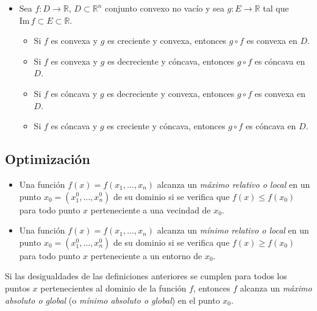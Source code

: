 \begin{Propty} 
\begin{itemize}
\item[v) ] Sea $f : D \to \mathbb{R}$, $D \subset \mathbb{R}^n$ conjunto convexo no vac\'io y sea $g : E \to \mathbb{R}$ tal que $\mathrm{Im}\, f \subset E \subset \mathbb{R}$.
\begin{itemize}
\item[a) ] Si $f$ es convexa y $g$ es creciente y convexa, entonces $g \circ f$ es convexa en $D$.

\item[b) ] Si $f$ es convexa y $g$ es decreciente y c\'oncava, entonces $g \circ f$ es c\'oncava en $D$.

\item[c) ] Si $f$ es c\'oncava y $g$ es decreciente y convexa, entonces $g \circ f$ es convexa en $D$.

\item[) ] Si $f$ es c\'oncava y $g$ es creciente y c\'oncava, entonces $g \circ f$ es c\'oncava en $D$.
\end{itemize}
\end{itemize}

\end{Propty}


\subsection{Optimizaci\'on}

\begin{Def}
\begin{itemize}
\item[i) ] Una funci\'on $f(x)=f(x_1,\ldots,x_n)$ alcanza un \textit{m\'aximo relativo o local} en un punto $x_0=(x_1^0,\ldots,x_n^0)$ de su dominio si se verifica que $f(x)\le f(x_0)$ para todo punto $x$ perteneciente a una vecindad de $x_0$.

\item[ii) ] Una funci\'on $f(x)=f(x_1,\ldots,x_n)$ alcanza un \textit{m\'inimo relativo o local} en un punto  $x_0=(x_1^0,\ldots,x_n^0)$ de su dominio si se verifica que $f(x)\ge f(x_0)$ para todo punto $x$ perteneciente a un entorno de $x_0$.
\end{itemize}
\end{Def}

\begin{Obs}
Si las desigualdades de las definiciones anteriores se cumplen para todos los puntos $x$ pertenecientes al dominio de la funci\'on $f$, entonces $f$ alcanza un \textit{m\'aximo absoluto o global} (o \textit{m\'inimo absoluto o global}) en el punto $x_0$.
\end{Obs}


